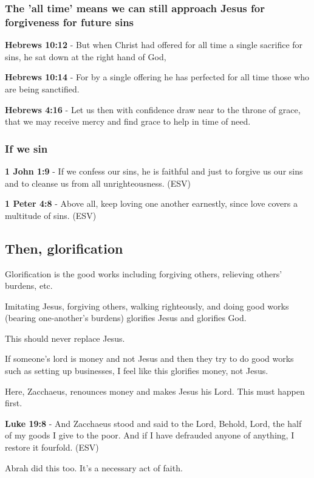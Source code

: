 \documentclass[11pt]{article}
\begin{document}
\subsubsection{The 'all time' means we can still approach Jesus for forgiveness for future sins}
\label{sec:org1d84784}
\textbf{Hebrews 10:12} - But when Christ had offered for all time a single sacrifice for sins, he sat down at the right hand of God,

\textbf{Hebrews 10:14} - For by a single offering he has perfected for all time those who are being sanctified.

\textbf{Hebrews 4:16} - Let us then with confidence draw near to the throne of grace, that we may receive mercy and find grace to help in time of need.

\subsubsection{If we sin}
\label{sec:org91ade5d}
\textbf{1 John 1:9} -  If we confess our sins, he is faithful and just to forgive us our sins and to cleanse us from all unrighteousness.  (ESV)

\textbf{1 Peter 4:8} -  Above all, keep loving one another earnestly, since love covers a multitude of sins.  (ESV)

\subsection{Then, glorification}
\label{sec:org15b2dc8}
Glorification is the good works including forgiving others, relieving others' burdens, etc.

Imitating Jesus, forgiving others, walking righteously, and doing good works (bearing one-another's burdens) glorifies Jesus and glorifies God.

This should never replace Jesus.

If someone's lord is money and not Jesus and then they try to do good works such as setting up businesses, I feel like this glorifies money, not Jesus.

Here, Zacchaeus, renounces money and makes Jesus his Lord. This must happen first.

\textbf{Luke 19:8} - And Zacchaeus stood and said to the Lord, Behold, Lord, the half of my goods I give to the poor.  And if I have defrauded anyone of anything, I restore it fourfold.  (ESV)

Abrah did this too. It's a necessary act of faith.
\end{document}
